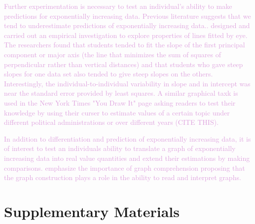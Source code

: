 \documentclass[]{interact}
\theoremstyle{plain}%
\theoremstyle{definition}
\theoremstyle{remark}
\begin{document}
\textcolor{Plum}{
Further experimentation is necessary to test an individual's ability to make predictions for exponentially increasing data. 
Previous literature suggests that we tend to underestimate predictions of exponentially increasing data.\citep{jones_generalized_1979, jones_polynomial_1977, wagenaar_extrapolation_1978}.
\citep{mosteller_eye_1981} designed and carried out an empirical investigation to explore properties of lines fitted by eye. 
The researchers found that students tended to fit the slope of the first principal component or major axis (the line that minimizes the sum of squares of perpendicular rather than vertical distances) and that students who gave steep slopes for one data set also tended to give steep slopes on the others. 
Interestingly, the individual-to-individual variability in slope and in intercept was near the standard error provided by least squares.
A similar graphical taxk is used in the New York Times "You Draw It" page asking readers to test their knowledge by using their curser to estimate values of a certain topic under different political administrations or over different years (CITE THIS).
}

\textcolor{Plum}{
In addition to differentiation and prediction of exponentially increasing data, it is of interest to test an individuals ability to translate a graph of exponentially increasing data into real value quantities and extend their estimations by making comparisons. 
\citep{friel_making_2001} emphasize the importance of graph comprehension proposing that the graph construction plays a role in the ability to read and interpret graphs.
}

\hypertarget{supplementary-materials}{%
\section*{Supplementary Materials}\label{supplementary-materials}}



\end{document}
